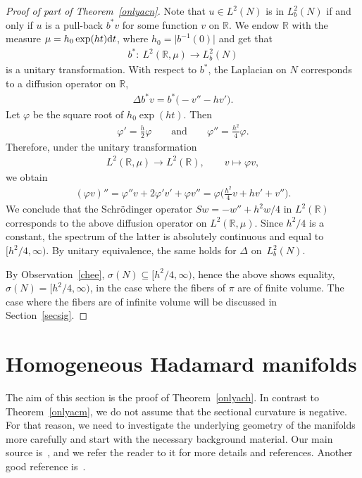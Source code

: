 \documentclass[10pt,a4paper]{amsart}
\numberwithin{equation}{section}
\def\R{\mathbb R}
\def\vf{\varphi}
\begin{document}
\begin{proof}[Proof of part of Theorem~\ref{onlyacn}]
Note that $u\in L^2(N)$ is in $L^2_b(N)$ if and only if $u$ is a pull-back $b^*v$ for some function $v$ on $\R$.
We endow $\R$ with the measure $\mu=h_0\exp(ht){\rm d}t$,
where $h_0=\big|b^{-1}(0)\big|$ and get that
\begin{align*}%
	b^* \colon \ L^2(\R,\mu) \to L^2_b(N)
\end{align*}
is a unitary transformation.
With respect to $b^*$, the Laplacian on $N$ corresponds to a diffusion operator on $\R$,
\begin{align*}%
	\Delta b^*v = b^*\bigl(- v'' - hv'\bigr).
\end{align*}
Let $\vf$ be the square root of $h_0\exp(ht)$.
Then
\begin{align*}%
	\vf' = \frac{h}2\vf \qquad\text{and}\qquad \vf'' = \frac{h^2}4\vf.
\end{align*}
Therefore, under the unitary transformation
\begin{align*}
	L^2(\R,\mu) \to L^2(\R), \qquad v \mapsto \vf v,
\end{align*}
we obtain
\begin{align*}
	(\vf v)'' = \vf''v +2\vf'v' + \vf v'' = \vf\biggl(\frac{h^2}4 v + hv' + v''\biggr).
\end{align*}
We conclude that the Schr\"odinger operator $Sw=-w''+h^2w/4$ in $L^2(\R)$
corresponds to the above diffusion operator on $L^2(\R,\mu)$.
Since $h^2/4$ is a constant, the spectrum of the latter is absolutely continuous and equal to $\bigl[h^2/4,\infty\bigr)$.
By unitary equivalence, the same holds for $\Delta$ on~$L^2_b(N)$.

By Observation~\ref{chee}, $\sigma(N)\subseteq\bigl[h^2/4,\infty\bigr)$, hence the above shows equality,
$\sigma(N)=\bigl[h^2/4,\infty\bigr)$, in the case where the fibers of $\pi$ are of finite volume.
The case where the fibers are of infinite volume will be discussed in Section~\ref{secsig}.
\end{proof}

\section{Homogeneous Hadamard manifolds}
\label{sechom}

The aim of this section is the proof of Theorem~\ref{onlyach}.
In contrast to Theorem~\ref{onlyacm}, we do not assume that the sectional curvature is negative.
For that reason, we need to investigate the underlying geometry of the manifolds more carefully
and start with the necessary background material.
Our main source is~\cite{Wolter91},
and we refer the reader to it for more details and references.
Another good reference is~\cite{Heber93}.
\end{document}
